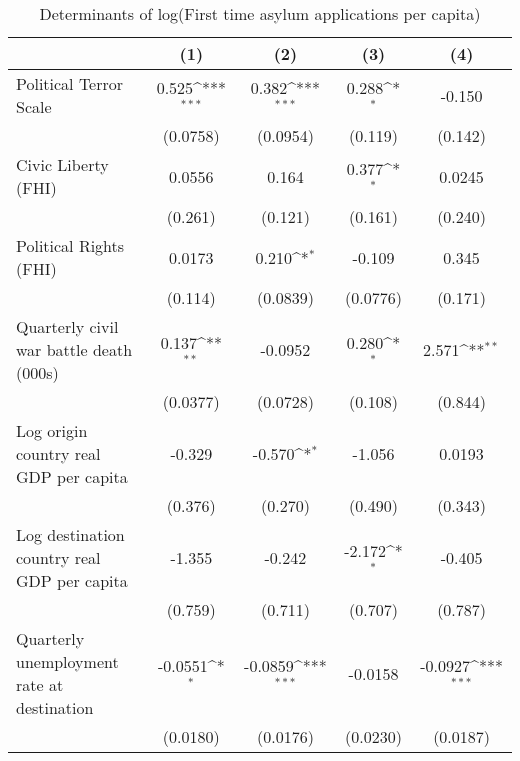 \begin{table}[htbp]\centering
\def\sym#1{\ifmmode^{#1}\else\(^{#1}\)\fi}
\caption{Determinants of log(First time asylum applications per capita)}
\begin{tabular}{l*{4}{c}}
\hline\hline
                    &\multicolumn{1}{c}{(1)}         &\multicolumn{1}{c}{(2)}         &\multicolumn{1}{c}{(3)}         &\multicolumn{1}{c}{(4)}         \\
\hline
Political Terror Scale&       0.525\sym{***}&       0.382\sym{***}&       0.288\sym{*}  &      -0.150         \\
                    &    (0.0758)         &    (0.0954)         &     (0.119)         &     (0.142)         \\
[1em]
Civic Liberty (FHI) &      0.0556         &       0.164         &       0.377\sym{*}  &      0.0245         \\
                    &     (0.261)         &     (0.121)         &     (0.161)         &     (0.240)         \\
[1em]
Political Rights (FHI)&      0.0173         &       0.210\sym{*}  &      -0.109         &       0.345         \\
                    &     (0.114)         &    (0.0839)         &    (0.0776)         &     (0.171)         \\
[1em]
Quarterly civil war battle death (000s)&       0.137\sym{**} &     -0.0952         &       0.280\sym{*}  &       2.571\sym{**} \\
                    &    (0.0377)         &    (0.0728)         &     (0.108)         &     (0.844)         \\
[1em]
Log origin country real GDP per capita&      -0.329         &      -0.570\sym{*}  &      -1.056         &      0.0193         \\
                    &     (0.376)         &     (0.270)         &     (0.490)         &     (0.343)         \\
[1em]
Log destination country real GDP per capita&      -1.355         &      -0.242         &      -2.172\sym{*}  &      -0.405         \\
                    &     (0.759)         &     (0.711)         &     (0.707)         &     (0.787)         \\
[1em]
Quarterly unemployment rate at destination&     -0.0551\sym{*}  &     -0.0859\sym{***}&     -0.0158         &     -0.0927\sym{***}\\
                    &    (0.0180)         &    (0.0176)         &    (0.0230)         &    (0.0187)         \\

\end{tabular}
\end{table}
